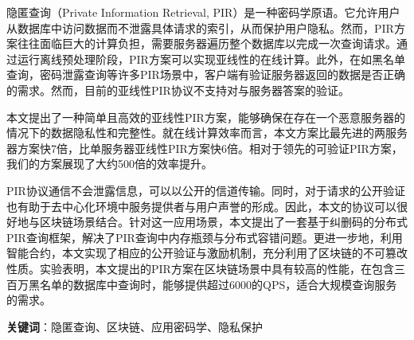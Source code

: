 \cleardoublepage
{}

隐匿查询（Private Information Retrieval, PIR）是一种密码学原语。它允许用户从数据库中访问数据而不泄露具体请求的索引，从而保护用户隐私。然而，PIR方案往往面临巨大的计算负担，需要服务器遍历整个数据库以完成一次查询请求。通过运行离线预处理阶段，PIR方案可以实现亚线性的在线计算。此外，在如黑名单查询，密码泄露查询等许多PIR场景中，客户端有验证服务器返回的数据是否正确的需求。然而，目前的亚线性PIR协议不支持对与服务器答案的验证。

本文提出了一种简单且高效的亚线性PIR方案，能够确保在存在一个恶意服务器的情况下的数据隐私性和完整性。就在线计算效率而言，本文方案比最先进的两服务器方案快7倍，比单服务器亚线性PIR方案快6倍。相对于领先的可验证PIR方案，我们的方案展现了大约500倍的效率提升。

PIR协议通信不会泄露信息，可以以公开的信道传输。同时，对于请求的公开验证也有助于去中心化环境中服务提供者与用户声誉的形成。因此，本文的协议可以很好地与区块链场景结合。针对这一应用场景，本文提出了一套基于纠删码的分布式PIR查询框架，解决了PIR查询中内存瓶颈与分布式容错问题。更进一步地，利用智能合约，本文实现了相应的公开验证与激励机制，充分利用了区块链的不可篡改性质。实验表明，本文提出的PIR方案在区块链场景中具有较高的性能，在包含三百万黑名单的数据库中查询时，能够提供超过6000的QPS，适合大规模查询服务的需求。

\bigskip
\noindent \textbf{关键词}：隐匿查询、区块链、应用密码学、隐私保护
\cleardoublepage
{}